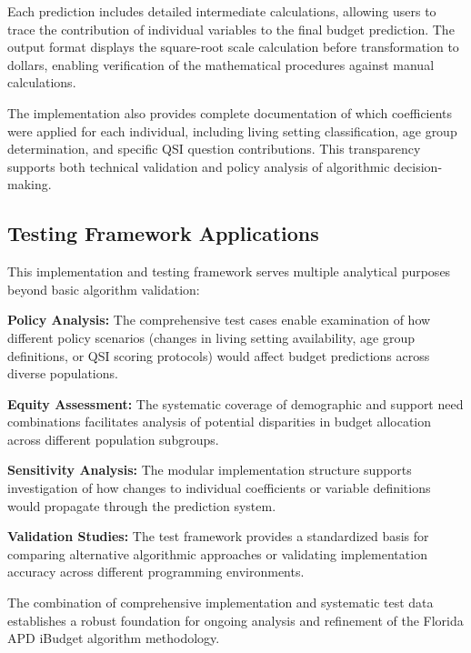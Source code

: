 Each prediction includes detailed intermediate calculations, allowing users to trace the contribution of individual variables to the final budget prediction. The output format displays the square-root scale calculation before transformation to dollars, enabling verification of the mathematical procedures against manual calculations.

The implementation also provides complete documentation of which coefficients were applied for each individual, including living setting classification, age group determination, and specific QSI question contributions. This transparency supports both technical validation and policy analysis of algorithmic decision-making.

\subsection{Testing Framework Applications}

This implementation and testing framework serves multiple analytical purposes beyond basic algorithm validation:

\textbf{Policy Analysis:} The comprehensive test cases enable examination of how different policy scenarios (changes in living setting availability, age group definitions, or QSI scoring protocols) would affect budget predictions across diverse populations.

\textbf{Equity Assessment:} The systematic coverage of demographic and support need combinations facilitates analysis of potential disparities in budget allocation across different population subgroups.

\textbf{Sensitivity Analysis:} The modular implementation structure supports investigation of how changes to individual coefficients or variable definitions would propagate through the prediction system.

\textbf{Validation Studies:} The test framework provides a standardized basis for comparing alternative algorithmic approaches or validating implementation accuracy across different programming environments. 

The combination of comprehensive implementation and systematic test data establishes a robust foundation for ongoing analysis and refinement of the Florida APD iBudget algorithm methodology.

